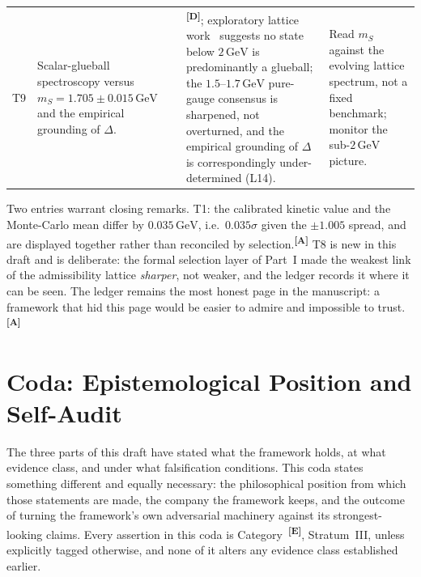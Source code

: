 \documentclass[12pt,a4paper,twoside]{article}
\theoremstyle{plain}
\theoremstyle{definition}
\theoremstyle{remark}
\newcommand{\GeV}{\,\mathrm{GeV}}
\newcommand{\catmark}[1]{\textsuperscript{\textsf{\textbf{[#1]}}}}
\begin{document}
{\begin{longtable}{p{} p{} p{} p{}}
T9 & Scalar-glueball spectroscopy versus $m_S = 1.705 \pm 0.015\GeV$ and the empirical grounding of $\Delta$. & \catmark{D}; exploratory lattice work~\cite{morningstar2024} suggests no state below $2\,\mathrm{GeV}$ is predominantly a glueball; the $1.5$--$1.7\,\mathrm{GeV}$ pure-gauge consensus is sharpened, not overturned, and the empirical grounding of $\Delta$ is correspondingly under-determined (L14). & Read $m_S$ against the evolving lattice spectrum, not a fixed benchmark; monitor the sub-$2\,\mathrm{GeV}$ picture. \\
\end{longtable}
}

\noindent Two entries warrant closing remarks. T1: the calibrated
kinetic value and the Monte-Carlo mean differ by $0.035\,\mathrm{GeV}$,
i.e.\ $0.035\sigma$ given the $\pm1.005$ spread, and are displayed together
rather than reconciled by selection.\catmark{A} T8 is new in this draft
and is deliberate: the formal selection layer of Part~I made the
weakest link of the admissibility lattice \emph{sharper}, not weaker,
and the ledger records it where it can be seen. The ledger remains the
most honest page in the manuscript: a framework that hid this page would
be easier to admire and impossible to trust.\catmark{A}



\newpage


\newpage
\part*{Coda: Epistemological Position and Self-Audit}
\label{part:coda}

\noindent The three parts of this draft have stated what the framework
holds, at what evidence class, and under what falsification conditions.
This coda states something different and equally necessary: the
philosophical position from which those statements are made, the company
the framework keeps, and the outcome of turning the framework's own
adversarial machinery against its strongest-looking claims. Every
assertion in this coda is Category~\catmark{E}, Stratum~III, unless
explicitly tagged otherwise, and none of it alters any evidence class
established earlier.
\end{document}
